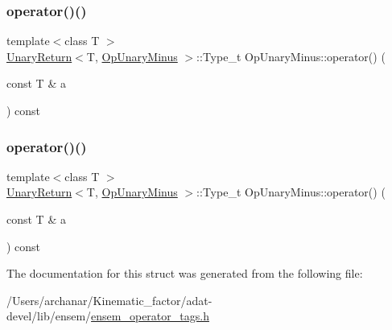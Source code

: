 \mbox{\label{structOpUnaryMinus_a76748f9d3b2f6a7bebac4a7427f86e3d}} 
\subsubsection{\texorpdfstring{operator()()}{operator()()}\hspace{0.1cm}{\footnotesize\ttfamily [2/3]}}
{\footnotesize\ttfamily template$<$class T $>$ \\
\mbox{\hyperlink{structUnaryReturn}{Unary\+Return}}$<$T, \mbox{\hyperlink{structOpUnaryMinus}{Op\+Unary\+Minus}} $>$\+::Type\+\_\+t Op\+Unary\+Minus\+::operator() (\begin{DoxyParamCaption}\item[{const T \&}]{a }\end{DoxyParamCaption}) const\hspace{0.3cm}{\ttfamily [inline]}}

\mbox{\label{structOpUnaryMinus_a76748f9d3b2f6a7bebac4a7427f86e3d}} 
\subsubsection{\texorpdfstring{operator()()}{operator()()}\hspace{0.1cm}{\footnotesize\ttfamily [3/3]}}
{\footnotesize\ttfamily template$<$class T $>$ \\
\mbox{\hyperlink{structUnaryReturn}{Unary\+Return}}$<$T, \mbox{\hyperlink{structOpUnaryMinus}{Op\+Unary\+Minus}} $>$\+::Type\+\_\+t Op\+Unary\+Minus\+::operator() (\begin{DoxyParamCaption}\item[{const T \&}]{a }\end{DoxyParamCaption}) const\hspace{0.3cm}{\ttfamily [inline]}}



The documentation for this struct was generated from the following file\+:\begin{DoxyCompactItemize}
\item 
/\+Users/archanar/\+Kinematic\+\_\+factor/adat-\/devel/lib/ensem/\mbox{\hyperlink{adat-devel_2lib_2ensem_2ensem__operator__tags_8h}{ensem\+\_\+operator\+\_\+tags.\+h}}\end{DoxyCompactItemize}
